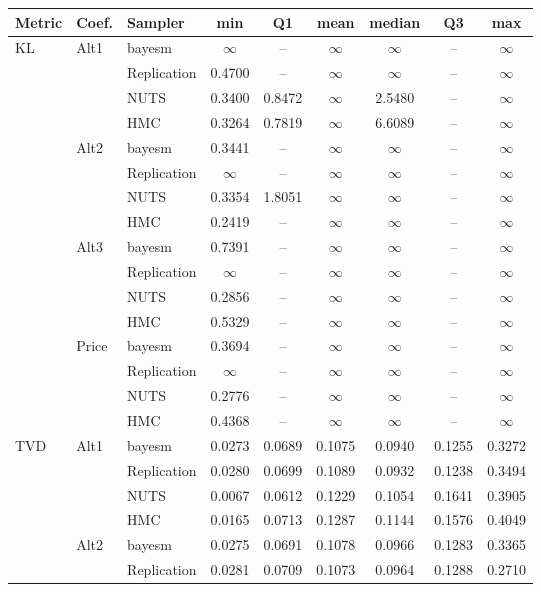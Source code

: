 \begin{tabular}{lllcccccc}
\toprule
Metric & Coef. & Sampler & min & Q1 & mean & median & Q3 & max \\
\midrule
KL & Alt1 & bayesm & $\infty$ & {--} & $\infty$ & $\infty$ & {--} & $\infty$ \\
 &  & Replication & 0.4700 & {--} & $\infty$ & $\infty$ & {--} & $\infty$ \\
 &  & NUTS & 0.3400 & 0.8472 & $\infty$ & 2.5480 & {--} & $\infty$ \\
 &  & HMC & 0.3264 & 0.7819 & $\infty$ & 6.6089 & {--} & $\infty$ \\
 & Alt2 & bayesm & 0.3441 & {--} & $\infty$ & $\infty$ & {--} & $\infty$ \\
 &  & Replication & $\infty$ & {--} & $\infty$ & $\infty$ & {--} & $\infty$ \\
 &  & NUTS & 0.3354 & 1.8051 & $\infty$ & $\infty$ & {--} & $\infty$ \\
 &  & HMC & 0.2419 & {--} & $\infty$ & $\infty$ & {--} & $\infty$ \\
 & Alt3 & bayesm & 0.7391 & {--} & $\infty$ & $\infty$ & {--} & $\infty$ \\
 &  & Replication & $\infty$ & {--} & $\infty$ & $\infty$ & {--} & $\infty$ \\
 &  & NUTS & 0.2856 & {--} & $\infty$ & $\infty$ & {--} & $\infty$ \\
 &  & HMC & 0.5329 & {--} & $\infty$ & $\infty$ & {--} & $\infty$ \\
 & Price & bayesm & 0.3694 & {--} & $\infty$ & $\infty$ & {--} & $\infty$ \\
 &  & Replication & $\infty$ & {--} & $\infty$ & $\infty$ & {--} & $\infty$ \\
 &  & NUTS & 0.2776 & {--} & $\infty$ & $\infty$ & {--} & $\infty$ \\
 &  & HMC & 0.4368 & {--} & $\infty$ & $\infty$ & {--} & $\infty$ \\
TVD & Alt1 & bayesm & 0.0273 & 0.0689 & 0.1075 & 0.0940 & 0.1255 & 0.3272 \\
 &  & Replication & 0.0280 & 0.0699 & 0.1089 & 0.0932 & 0.1238 & 0.3494 \\
 &  & NUTS & 0.0067 & 0.0612 & 0.1229 & 0.1054 & 0.1641 & 0.3905 \\
 &  & HMC & 0.0165 & 0.0713 & 0.1287 & 0.1144 & 0.1576 & 0.4049 \\
 & Alt2 & bayesm & 0.0275 & 0.0691 & 0.1078 & 0.0966 & 0.1283 & 0.3365 \\
 &  & Replication & 0.0281 & 0.0709 & 0.1073 & 0.0964 & 0.1288 & 0.2710 \\

\end{tabular}
